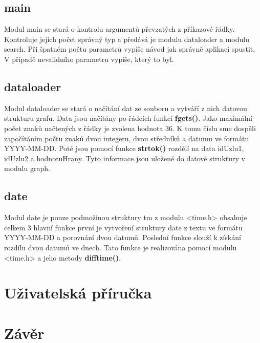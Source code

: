 \section{main}
Modul main se stará o kontrolu argumentů převzatých z příkazové řádky. Kontroluje jejich počet správný typ a předává je modulu dataloader a modulu search. Při špatném počtu parametrů vypíše návod jak správně aplikaci spustit. V případě nevalidního parametru vypíše, který to byl.

\section{dataloader}
Modul dataloader se stará o načítání dat ze souboru a vytváří z nich datovou strukturu grafu. Data jsou načítány po řádcích funkcí \textbf{fgets()}. Jako maximální počet znaků načtených z řádky je zvolena hodnota 36. K tomu číslu sme dospěli započítáním počtu znaků dvou integeru, dvou středníků a datumu ve formátu YYYY-MM-DD. Poté jsou pomocí funkce \textbf{strtok()} rozdělí na data idUzlu1, idUzlu2 a hodnotuHrany. Tyto informace jsou uložené do datové struktury v modulu graph.

\section{date}
Modul date je pouze podmožinou struktury tm z modulu <time.h> obsahuje celkem 3 hlavní funkce první je vytvoření struktury date z textu ve formátu YYYY-MM-DD a porovnání dvou datumů. Poslední funkce slouží k získání rozdílu dvou datumů ve dnech. Tato funkce je realizována pomocí modulu <time.h> a jeho metody \textbf{difftime()}.



\chapter{Uživatelská příručka}

\chapter{Závěr}

